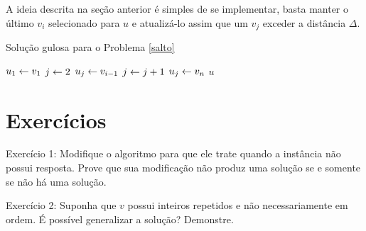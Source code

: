 A ideia descrita na seção anterior é simples de se implementar, basta manter o último $v_i$ selecionado para $u$ e atualizá-lo assim que um $v_j$ exceder a distância $\Delta$.

\begin{algorithm}[H]
\caption{Solução gulosa para o Problema \ref{salto}}
\label{salto:code}
\begin{algorithmic}[1]
    \State $u_1 \leftarrow v_1$
    \State $j \leftarrow 2$
            \State $u_j \leftarrow v_{i - 1}$
            \State $j \leftarrow j + 1$
        \EndIf
    \EndFor
    \State $u_j \leftarrow v_n$
    \State \Return $u$
\EndFunction
\end{algorithmic}
\end{algorithm}


\section{Exercícios}

Exercício 1: Modifique o algoritmo para que ele trate quando a instância não possui resposta. Prove que sua modificação não produz uma solução se e somente se não há uma solução.

Exercício 2: Suponha que $v$ possui inteiros repetidos e não necessariamente em ordem. É possível generalizar a solução? Demonstre.

